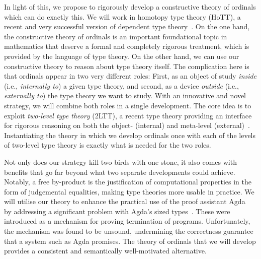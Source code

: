 \documentclass[a4paper,11pt]{article}
\let\oldcite\cite
\renewcommand*\cite[1]{{\protect\NoHyper\oldcite{#1}\protect\endNoHyper}}
\begin{document}
In light of this, we propose to rigorously develop a constructive theory of ordinals which can do exactly this. %
We will work in homotopy type theory (HoTT), a recent and very successful version of dependent type theory~\cite{hott-book}.
%
On the one hand, the constructive theory of ordinals is an important foundational topic in mathematics that deserve a formal and completely rigorous treatment, which is provided by the language of type theory. On the other hand, we can use our constructive theory to reason about type theory itself.
%
The complication here is that ordinals appear in two very different roles: First, as an object of study \emph{inside} (i.e., \emph{internally to}) a given type theory, and second, as a device \emph{outside} (i.e., \emph{externally to}) the type theory we want to study.
%
%
With an innovative and novel strategy, we will combine both roles in a single development.
The core idea is to exploit \emph{two-level type theory} (2LTT), a recent type theory providing an interface for rigorous reasoning on both the object- (internal) and meta-level (external)~\cite{annenkov_capriotti_kraus_sattler_2023}.
Instantiating the theory in which we develop ordinals once with each of the levels of two-level type theory is exactly what is needed for the two roles.

Not only does our strategy kill two birds with one stone, %
it also comes with benefits that go far beyond what two separate developments could achieve.
Notably, a free by-product is the justification of computational properties in the form of judgemental equalities, making type theories more usable in practice.
%
We will utilise our theory to enhance the practical use of the proof assistant Agda~\cite{Agda} by addressing a %
significant problem with Agda's sized types~\cite{Agda-sized-types-unsound}. These were introduced as a mechanism for %
proving termination of programs. Unfortunately, the mechanism was found to be unsound, undermining the correctness guarantee that a system such as Agda promises. The theory of ordinals that we will develop provides a consistent and semantically well-motivated alternative. %


\end{document}
